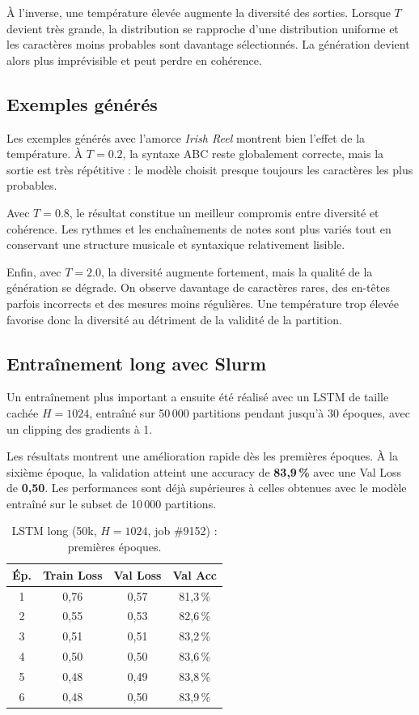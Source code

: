 \documentclass[11pt,a4paper]{article}
\begin{document}
À l'inverse, une température élevée augmente la diversité des sorties.
Lorsque $T$ devient très grande, la distribution se rapproche d'une
distribution uniforme et les caractères moins probables sont davantage
sélectionnés. La génération devient alors plus imprévisible et peut
perdre en cohérence.

\subsection{Exemples générés}

Les exemples générés avec l'amorce \emph{Irish Reel} montrent bien
l'effet de la température. À $T=0.2$, la syntaxe ABC reste globalement
correcte, mais la sortie est très répétitive : le modèle choisit presque
toujours les caractères les plus probables.

Avec $T=0.8$, le résultat constitue un meilleur compromis entre
diversité et cohérence. Les rythmes et les enchaînements de notes sont
plus variés tout en conservant une structure musicale et syntaxique
relativement lisible.

Enfin, avec $T=2.0$, la diversité augmente fortement, mais la qualité
de la génération se dégrade. On observe davantage de caractères rares,
des en-têtes parfois incorrects et des mesures moins régulières. Une
température trop élevée favorise donc la diversité au détriment de la
validité de la partition.

\subsection{Entraînement long avec Slurm}

Un entraînement plus important a ensuite été réalisé avec un LSTM de
taille cachée $H=1024$, entraîné sur 50\,000 partitions pendant
jusqu'à 30 époques, avec un clipping des gradients à 1.

Les résultats montrent une amélioration rapide dès les premières
époques. À la sixième époque, la validation atteint une accuracy de
\textbf{83,9\,\%} avec une Val Loss de \textbf{0,50}. Les performances
sont déjà supérieures à celles obtenues avec le modèle entraîné sur le
subset de 10\,000 partitions.

\begin{table}[H]
\centering
\small
\caption{LSTM long (50k, $H=1024$, job \#9152) : premières époques.}
\begin{tabular}{@{}cccc@{}}
\toprule
Ép. & Train Loss & Val Loss & Val Acc \\
\midrule
1 & 0,76 & 0,57 & 81,3\,\% \\
2 & 0,55 & 0,53 & 82,6\,\% \\
3 & 0,51 & 0,51 & 83,2\,\% \\
4 & 0,50 & 0,50 & 83,6\,\% \\
5 & 0,48 & 0,49 & 83,8\,\% \\
6 & 0,48 & 0,50 & 83,9\,\% \\
\bottomrule
\end{tabular}
\end{table}
\end{document}
